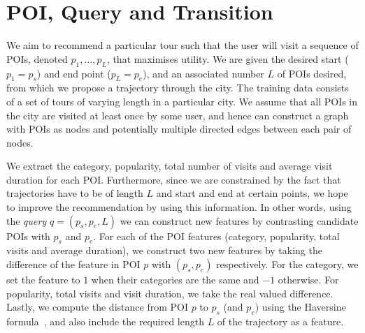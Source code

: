 \section{POI, Query and Transition}
\label{sec:feature}


We aim to recommend a particular tour such that the user will visit a sequence of POIs, denoted $p_1, \ldots, p_L$, that maximises utility. We are given the desired start ($p_1=p_s$) and end point ($p_L=p_e$), and an associated number $L$ of POIs desired, from which we propose a trajectory through the city.
%
%
The training data consists of a set of tours of varying length in a particular city. We assume that all POIs %
in the city are visited at least once by some user, and hence can construct a graph with POIs as nodes and potentially multiple directed edges between each pair of nodes. 




We extract the category, popularity, total number of visits and average visit duration for each POI.
Furthermore, since we are constrained by the fact that trajectories have to be of length $L$ and start and end at certain points, we hope to improve the recommendation by using this information.
In other words, using the \textit{query} $q = (p_s, p_e, L)$ we can construct new features by contrasting candidate POIs with $p_s$ and $p_e$.
%
For each of the POI features (category, popularity, total visits and average duration),
we construct two new features by taking the difference of the feature in POI $p$ with $(p_s, p_e)$ respectively.
For the category, we set the feature to $1$ when their categories are the same and $-1$ otherwise.
For popularity, total visits and visit duration, we take the real valued difference.
Lastly, we compute the distance from POI $p$ to $p_s$ (and $p_e$) using the Haversine formula~\cite{haversine},
and also include the required length $L$ of the trajectory as a feature.



